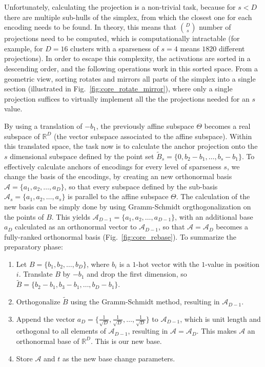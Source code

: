 			Unfortunately, calculating the projection is a non-trivial task, because for $s < D$ there are multiple sub-hulls of the simplex, from which the closest one for each encoding needs to be found.
			In theory, this means that $\binom{D}{s}$ number of projections need to be computed, which is computationally intractable (for example, for $D = 16$ clusters with a sparseness of $s = 4$ means $1820$ different projections).
			In order to escape this complexity, the activations are sorted in a descending order, and the following operations work in this sorted space.
			From a geometric view, sorting rotates and mirrors all parts of the simplex into a single section (illustrated in Fig.~\ref{fig:core_rotate_mirror}), where only a single projection suffices to virtually implement all the the projections needed for an $s$ value.
			
			By using a translation of $-b_1$, the previously affine subspace $\Theta$ becomes a real subspace of $\mathbb{R}^D$ (the vector subspace associated to the affine subspace).
			Within this translated space, the task now is to calculate the anchor projection onto the $s$ dimensional subspace defined by the point set $\widetilde{B}_s = \{0, b_2 - b_1, \dots, b_s - b_1\}$.
			To effectively calculate anchors of encodings for every level of sparseness $s$, we change the basis of the encodings, by creating an new orthonormal basis $\mathcal{A}=\{a_1, a_2, \dots, a_D \}$, so that every subspace defined by the sub-basis $\mathcal{A}_s=\{a_1, a_2, \dots, a_s \}$ is parallel to the affine subspace $\Theta$.
			The calculation of the new basis can be simply done by using Gramm-Schmidt orgthogonalization on the points of $B$.
			This yields $\mathcal{A}_{D-1} = \{a_1, a_2, \dots, a_{D-1} \}$, with an additional base $a_D$ calculated as an orthonormal vector to $\mathcal{A}_{D-1}$, so that $\mathcal{A} = \mathcal{A}_D$ becomes a fully-ranked orthonormal basis (Fig.~\ref{fig:core_rebase}).
			To summarize the preparatory phase:
			\begin{enumerate}
				\item
					Let $B = \{b_1, b_2, \dots, b_D\}$, where $b_i$ is a $1$-hot vector with the $1$-value in position $i$.
					Translate $B$ by $-b_1$ and drop the first dimension, so $\widetilde{B} = \{b_2 - b_1, b_3 - b_1, \dots, b_D - b_1\}$.
					
				\item
					Orthogonalize $\widetilde{B}$ using the Gramm-Schmidt method, resulting in $\mathcal{A}_{D-1}$.
					
				\item
					Append the vector $a_D = \{\frac{1}{\sqrt{D}}, \frac{1}{\sqrt{D}}, \dots, \frac{1}{\sqrt{D}}\}$ to $\mathcal{A}_{D-1}$, which is unit length and orthogonal to all elements of $\mathcal{A}_{D-1}$, resulting in $\mathcal{A} = \mathcal{A}_D$.
					This makes $\mathcal{A}$ an orthonormal base of $\mathbb{R}^D$. This is our new base.
					
				\item
					Store $\mathcal{A}$ and $t$ as the new base change parameters.
			\end{enumerate}
			
